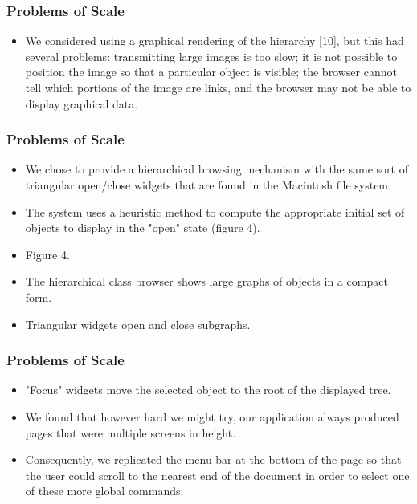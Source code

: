 \documentclass{beamer}
\begin{document}
\begin{frame}
\frametitle{Problems of Scale}

\begin{itemize}
\item We considered using a graphical rendering of the hierarchy [10], but this had several problems: transmitting large images is too slow; it is not possible to position the image so that a particular object is visible; the browser cannot tell which portions of the image are links, and the browser may not be able to display graphical data.
\end{itemize}

\end{frame}

\begin{frame}
\frametitle{Problems of Scale}

\begin{itemize}
\item We chose to provide a hierarchical browsing mechanism with the same sort of triangular open/close widgets that are found in the Macintosh file system.
\item The system uses a heuristic method to compute the appropriate initial set of objects to display in the "open" state (figure 4).
\item Figure 4.
\item The hierarchical class browser shows large graphs of objects in a compact form.
\item Triangular widgets open and close subgraphs.
\end{itemize}

\end{frame}

\begin{frame}
\frametitle{Problems of Scale}

\begin{itemize}
\item "Focus" widgets move the selected object to the root of the displayed tree.
\item We found that however hard we might try, our application always produced pages that were multiple screens in height.
\item Consequently, we replicated the menu bar at the bottom of the page so that the user could scroll to the nearest end of the document in order to select one of these more global commands.
\end{itemize}

\end{frame}
\end{document}
